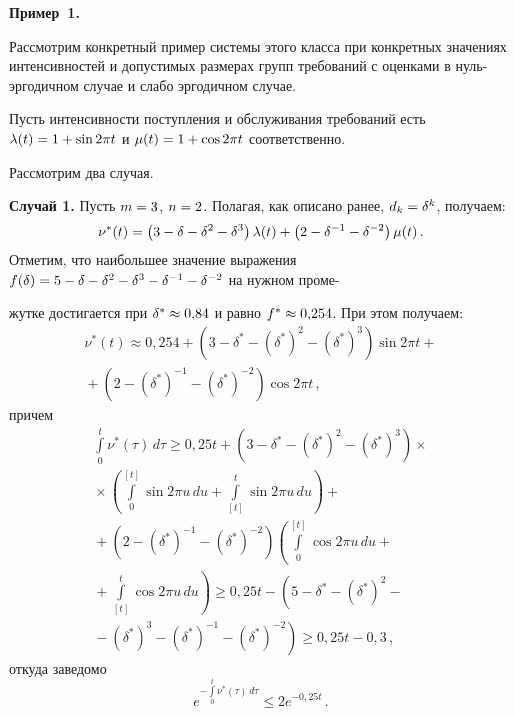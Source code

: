 \begin{multicols}{2}
\medskip

\noindent
\textbf{Пример~1.}

Рассмотрим конкретный пример системы этого класса при конкретных значениях интенсивностей 
и допустимых размерах групп требований с оценками в нуль-эр\-го\-дич\-ном случае и слабо 
эргодичном случае.

Пусть интенсивности поступления и обслуживания требований есть 
$\lambda(t)\hm=1\hm+\sin2\pi t$ и $\mu(t)\hm=1\hm+\cos2\pi t$ соответственно.

Рассмотрим два случая.

{\bf Случай 1.} Пусть $m \hm= 3$, $n\hm=2$. Полагая, как описано ранее,  $d_k\hm=\delta^{k}$, 
получаем:
\begin{equation*}
\nu^*(t) =  \left(3  -\delta -\delta^2-\delta^3\right)\lambda(t)  
+ \left(2 -\delta^{-1} -\delta^{-2}\right)\mu(t)\,.
\end{equation*}
Отметим, что наибольшее значение выражения $f(\delta)\hm=5-\delta \hm-\delta^2\hm-
\delta^3\hm-\delta^{-1} \hm-\delta^{-2}$
на нужном проме-\linebreak\vspace*{-12pt}

\pagebreak

\noindent
жутке достигается при $\delta^* \hm\approx 0{,}84$ и равно $f^* \hm\approx 0{,}254$.
При этом получаем:
\begin{multline*}
\nu^*(t) \approx 0{,}254 +\left(3  -\delta^* -(\delta^*)^2-(\delta^*)^3\right)\sin2\pi t  +{}\\
{}+ \left(2 -(\delta^*)^{-1} -(\delta^*)^{-2}\right)\cos2\pi t\,,
\end{multline*}
причем
\begin{multline}
\int\limits_0^t\nu^*(\tau)\,d\tau \ge  0{,}25 t  +\left(3  -\delta^* -
(\delta^*)^2-(\delta^*)^3\right)\times{}\\
{}\times 
\left(\int\limits_0^{[t]}\sin2\pi u \, du + 
\int\limits_{[t]}^{t}\sin2\pi u \, du \right) + {} \\ 
{}+\left(2 -(\delta^*)^{-1} -(\delta^*)^{-2}\right)\left(\int\limits_0^{[t]}
\cos 2\pi u \, du +{}\right.\\
\left.{}+ \int\limits_{[t]}^{t}\cos 2\pi u \, du \right) \ge  0{,}25 t  - \left(5  -\delta^* -(\delta^*)^2-{}\right.\\
\left.{}-(\delta^*)^3- (\delta^*)^{-1} 
-(\delta^*)^{-2}\right) \ge 0{,}25t - 0{,}3\,,
\label{3042}
\end{multline}
откуда заведомо
\begin{equation*}
e^{-\int\limits_0^t\nu^*(\tau)\,d\tau} \le 2 e^{- 0{,}25 t}\,.
\end{equation*}


\end{multicols}
